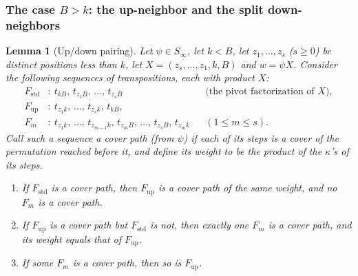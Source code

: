 \documentclass{amsart}
\newtheorem{lemma}{Lemma}[section]
\theoremstyle{definition}
\theoremstyle{remark}
\numberwithin{equation}{section}
\begin{document}
\subsubsection*{The case $B>k$: the up-neighbor and the split down-neighbors}

\begin{lemma}[Up/down pairing] \label{lemma:updown}
Let $\psi\in S_\infty$, let $k<B$, let $z_1,\ldots,z_s$ ($s\geq0$) be distinct positions less than $k$, let $X=(z_s,\ldots,z_1,k,B)$ and $w=\psi X$. Consider the following sequences of transpositions, each with product $X$:
\begin{align*}
F_{\mathrm{std}}&:\ t_{kB},\,t_{z_1B},\,\ldots,\,t_{z_sB} &&\text{(the pivot factorization of $X$)},\\
F_{\mathrm{up}}&:\ t_{z_1k},\,\ldots,\,t_{z_sk},\,t_{kB},\\
F_m&:\ t_{z_1k},\,\ldots,\,t_{z_{m-1}k},\,t_{z_mB},\,\ldots,\,t_{z_sB},\,t_{z_mk} &&(1\leq m\leq s).
\end{align*}
Call such a sequence a \emph{cover path} (from $\psi$) if each of its steps is a cover of the permutation reached before it, and define its \emph{weight} to be the product of the $\kappa$'s of its steps.
\begin{enumerate}
\item[(a)] If $F_{\mathrm{std}}$ is a cover path, then $F_{\mathrm{up}}$ is a cover path of the same weight, and no $F_m$ is a cover path.
\item[(b)] If $F_{\mathrm{up}}$ is a cover path but $F_{\mathrm{std}}$ is not, then exactly one $F_m$ is a cover path, and its weight equals that of $F_{\mathrm{up}}$.
\item[(c)] If some $F_m$ is a cover path, then so is $F_{\mathrm{up}}$.
\end{enumerate}
\end{lemma}
\end{document}
